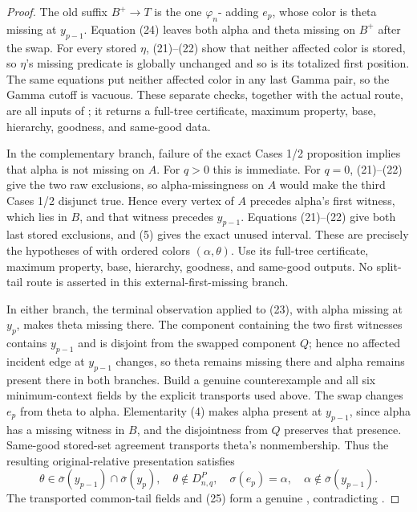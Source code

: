 \begin{proof}
The old suffix \(B^+\to T\) is the one
\(\varphi_n\)- adding \(e_p\), whose color
is theta missing at \(y_{p-1}\).  Equation (24) leaves both alpha and
theta missing on \(B^+\) after the swap.  For every stored \(\eta\),
(21)--(22) show that neither affected color is stored, so \(\eta\)'s
missing predicate is globally unchanged and so is its totalized first
position.  The same equations put neither affected color in any last
Gamma pair, so the Gamma cutoff is vacuous.  These separate checks,
together with the actual route, are all inputs of
; it returns a full-tree
 certificate, maximum property,
base, hierarchy, goodness, and same-good data.

In the complementary branch, failure of the exact Cases 1/2 proposition
implies that alpha is not missing on \(A\).  For \(q>0\) this is immediate.
For \(q=0\), (21)--(22) give the two raw exclusions, so alpha-missingness
on \(A\) would make the third Cases 1/2 disjunct true.  Hence every vertex
of \(A\) precedes alpha's first witness, which lies in \(B\), and that
witness precedes \(y_{p-1}\).  Equations (21)--(22) give both last stored
exclusions, and (5) gives the exact unused interval.  These are precisely
the hypotheses of  with ordered colors
\((\alpha,\theta)\).  Use its full-tree
 certificate, maximum
property, base, hierarchy, goodness, and same-good outputs.  No split-tail
route is asserted in this external-first-missing branch.

In either branch, the terminal observation applied to (23), with alpha
missing at \(y_p\), makes theta missing there.  The component containing
the two first witnesses contains \(y_{p-1}\) and is disjoint from the
swapped component \(Q\); hence no affected incident edge at
\(y_{p-1}\) changes, so theta remains missing there and alpha remains
present there in both branches.  Build a genuine counterexample and all six
minimum-context fields by the explicit transports used above.  The swap
changes \(e_p\) from theta to alpha.  Elementarity (4) makes alpha present
at \(y_{p-1}\), since alpha has a missing witness in \(B\), and the
disjointness from \(Q\) preserves that presence.  Same-good stored-set
agreement transports theta's nonmembership.  Thus the resulting
original-relative presentation satisfies
\[
 \theta\in\overline\sigma(y_{p-1})\cap\overline\sigma(y_p),
 \quad\theta\notin D^P_{n,q},\quad
 \sigma(e_p)=\alpha,\quad
 \alpha\notin\overline\sigma(y_{p-1}).                        \tag{25}
\]
The transported common-tail fields and (25) form a genuine
, contradicting
.


\end{proof}
